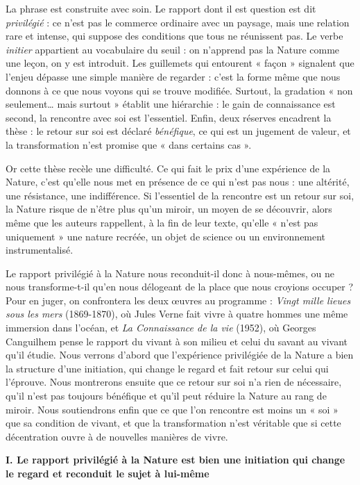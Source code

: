 \documentclass[11pt,a4paper]{article}
\begin{document}
La phrase est construite avec soin. Le rapport dont il est question est dit \emph{privilégié} : ce n'est pas le commerce ordinaire avec un paysage, mais une relation rare et intense, qui suppose des conditions que tous ne réunissent pas. Le verbe \emph{initier} appartient au vocabulaire du seuil : on n'apprend pas la Nature comme une leçon, on y est introduit. Les guillemets qui entourent « façon » signalent que l'enjeu dépasse une simple manière de regarder : c'est la forme même que nous donnons à ce que nous voyons qui se trouve modifiée. Surtout, la gradation « non seulement\ldots{} mais surtout » établit une hiérarchie : le gain de connaissance est second, la rencontre avec soi est l'essentiel. Enfin, deux réserves encadrent la thèse : le retour sur soi est déclaré \emph{bénéfique}, ce qui est un jugement de valeur, et la transformation n'est promise que « dans certains cas ».

Or cette thèse recèle une difficulté. Ce qui fait le prix d'une expérience de la Nature, c'est qu'elle nous met en présence de ce qui n'est pas nous : une altérité, une résistance, une indifférence. Si l'essentiel de la rencontre est un retour sur soi, la Nature risque de n'être plus qu'un miroir, un moyen de se découvrir, alors même que les auteurs rappellent, à la fin de leur texte, qu'elle « n'est pas uniquement » une nature recréée, un objet de science ou un environnement instrumentalisé.

Le rapport privilégié à la Nature nous reconduit-il donc à nous-mêmes, ou ne nous transforme-t-il qu'en nous délogeant de la place que nous croyions occuper ? Pour en juger, on confrontera les deux œuvres au programme : \emph{Vingt mille lieues sous les mers} (1869-1870), où Jules Verne fait vivre à quatre hommes une même immersion dans l'océan, et \emph{La Connaissance de la vie} (1952), où Georges Canguilhem pense le rapport du vivant à son milieu et celui du savant au vivant qu'il étudie. Nous verrons d'abord que l'expérience privilégiée de la Nature a bien la structure d'une initiation, qui change le regard et fait retour sur celui qui l'éprouve. Nous montrerons ensuite que ce retour sur soi n'a rien de nécessaire, qu'il n'est pas toujours bénéfique et qu'il peut réduire la Nature au rang de miroir. Nous soutiendrons enfin que ce que l'on rencontre est moins un « soi » que sa condition de vivant, et que la transformation n'est véritable que si cette décentration ouvre à de nouvelles manières de vivre.

\textbf{I. Le rapport privilégié à la Nature est bien une initiation qui change le regard et reconduit le sujet à lui-même}
\end{document}
